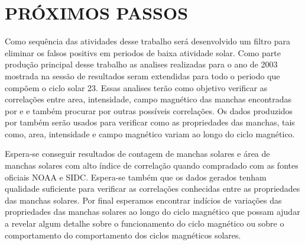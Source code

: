 
\section{PRÓXIMOS PASSOS}

Como sequência das atividades desse trabalho será desenvolvido um filtro para eliminar os falsos positivs em periodos de baixa atividade solar. Como parte produção principal desse trabalho as analises realizadas para o ano de 2003 mostrada na sessão de resultados seram extendidas para todo o periodo que compõem o ciclo solar 23. Essas analises terão como objetivo verificar as correlações entre area, intensidade, campo magnético das manchas encontradas por  e  e também procurar por outras possíveis correlações. Os dados produzidos por também serão usados para verificar como as propriedades das manchas, tais como, area, intensidade e campo magnético variam ao longo do ciclo magnético.

Espera-se conseguir resultados de contagem de manchas solares e área de manchas solares com alto índice de correlação quando compradado com as fontes oficiais NOAA e SIDC. Espera-se também que os dados gerados tenham qualidade suficiente para verificar as correlações conhecidas entre as propriedades das manchas solares. Por final esperamos encontrar indícios de variações das propriedades das manchas solares ao longo do ciclo magnético que possam ajudar a revelar algum detalhe sobre o funcionamento do ciclo magnético ou sobre o comportamento do comportamento dos ciclos magnéticos solares.

